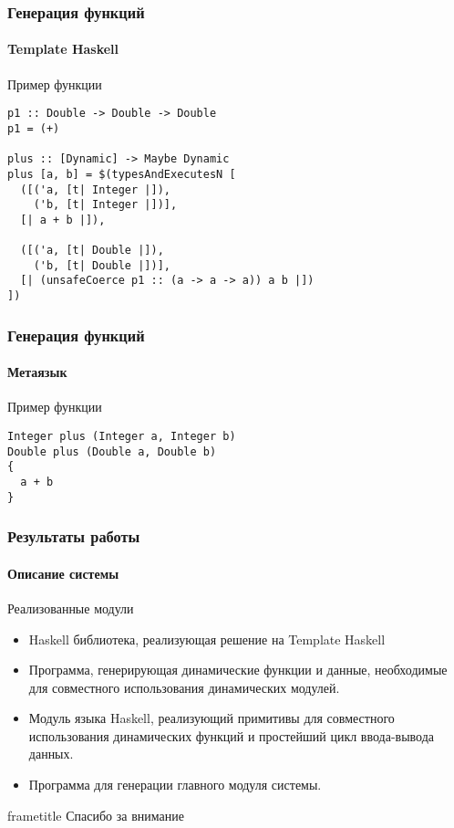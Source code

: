 \documentclass[ucs]{beamer}
\begin{document}

\begin{frame}[fragile]
  \frametitle{Генерация функций}
  \framesubtitle{Template Haskell}

  \begin{block}{Пример функции}
\begin{verbatim}
p1 :: Double -> Double -> Double
p1 = (+)

plus :: [Dynamic] -> Maybe Dynamic
plus [a, b] = $(typesAndExecutesN [
  ([('a, [t| Integer |]),
    ('b, [t| Integer |])],
  [| a + b |]),

  ([('a, [t| Double |]),
    ('b, [t| Double |])],
  [| (unsafeCoerce p1 :: (a -> a -> a)) a b |])
])
\end{verbatim}
  \end{block}
\end{frame}

\begin{frame}[fragile]
  \frametitle{Генерация функций}
  \framesubtitle{Метаязык}

  \begin{block}{Пример функции}
\begin{verbatim}
Integer plus (Integer a, Integer b)
Double plus (Double a, Double b)
{
  a + b
}
\end{verbatim}
  \end{block}
\end{frame}

\begin{frame}[fragile]
  \frametitle{Результаты работы}
  \framesubtitle{Описание системы}
  
  \begin{block}{Реализованные модули}
    \begin{itemize}
    \item Haskell библиотека, реализующая решение на Template Haskell
    \item Программа, генерирующая динамические функции и данные,
      необходимые для совместного использования динамических модулей.
    \item Модуль языка Haskell, реализующий примитивы для совместного
      использования динамических функций и простейший цикл
      ввода-вывода данных.
    \item Программа для генерации главного модуля системы.
    \end{itemize}
  \end{block}
\end{frame}

\begin{frame}
  \begin{beamercolorbox}[ht=2.5ex,dp=1ex,center,rounded=true,shadow=true]
    {frametitle}
    Спасибо за внимание
  \end{beamercolorbox}
\end{frame}
\end{document}
